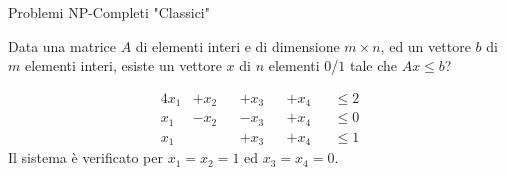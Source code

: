 \begin{frame}{Problemi NP-Completi "Classici"}
	
\vspace{-9pt}
\begin{myboxtitle}
Data una matrice $A$ di elementi interi e di dimensione $m \times n$, ed un
vettore $b$ di $m$ elementi interi, esiste un vettore $x$ di $n$ elementi $0$/$1$ tale che $Ax \le b$?
\end{myboxtitle}

\begin{myboxtitle}[Esempio]
\begin{alignat*}{4}
x_1 &+ x_2 &&+ x_3 &&+ x_4 &&\le 2\\
x_1 &- x_2 &&- x_3 &&+ x_4 &&\le 0\\
x_1 &&&+ x_3 &&+ x_4 &&\le 1
\end{alignat*}
Il sistema è verificato per $x_1 = x_2 = 1$ ed $x_3 = x_4 = 0$.
\end{myboxtitle}

\end{frame}

